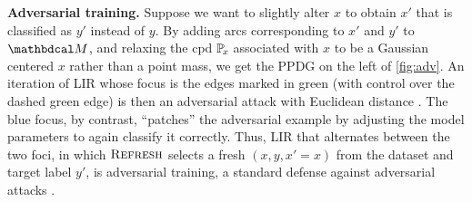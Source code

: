\textbf{Adversarial training.}
Suppose we want to slightly alter $x$ to obtain $x'$ that is classified as $y'$ instead of $y$.
By adding arcs corresponding to $x'$ and $y'$ to $\dg M$,
    and relaxing the cpd $\p_x$ associated with $x$ to be a Gaussian centered $x$ rather than a point mass,
    we get the PPDG on the left of \cref{fig:adv}.
%
An iteration of LIR
whose focus is the edges marked in green (with control over the dashed green edge)
is then an adversarial attack with Euclidean distance \citep{biggio2013advattk}.
The blue focus, by contrast, ``patches'' the adversarial example by
    adjusting the model parameters to again classify it correctly.
Thus, LIR
that alternates between the two foci,
in which $\textsc{Refresh}$ selects a fresh $(x,y,x'=x)$ from the dataset
    and target label $y'$,
is
adversarial training, a standard defense against adversarial attacks \citep{goodfellow2014explaining}.
%

